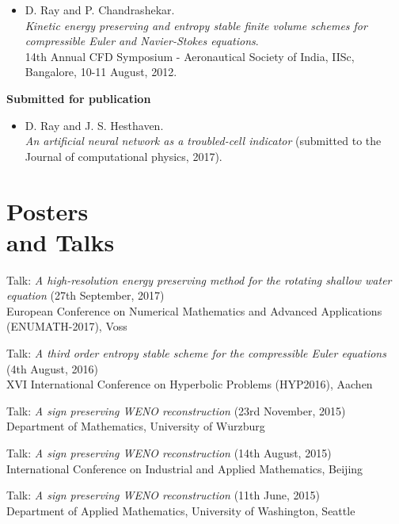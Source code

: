 \documentclass[margin]{res}
\begin{document}
\begin{resume}
\begin{itemize}
              \item D. Ray and P. Chandrashekar.\\
              {\it Kinetic energy preserving and entropy stable finite volume schemes for compressible Euler and Navier-Stokes equations}.\\
              14th Annual CFD Symposium - Aeronautical Society of India, IISc, Bangalore, 10-11 August, 2012.
             \end{itemize}

\textbf{Submitted for publication}                
            \begin{itemize}           
              
              \item D. Ray and J. S. Hesthaven.\\
              {\it An artificial neural network as a troubled-cell indicator} (submitted to the Journal of computational physics, 2017).
             \end{itemize}

             
\section{Posters \\ and Talks}
              
              Talk: {\it A high-resolution energy preserving method for the rotating shallow water equation} (27th September, 2017)\\
               European Conference on Numerical Mathematics and Advanced Applications (ENUMATH-2017), Voss
              
              Talk: {\it A third order entropy stable scheme for the compressible Euler equations} (4th August, 2016)\\
               XVI International Conference on Hyperbolic Problems (HYP2016), Aachen 
              
              Talk: {\it A sign preserving WENO reconstruction} (23rd November, 2015)\\
               Department of Mathematics, University of W$\ddot{\text{u}}$rzburg 
              
              Talk: {\it A sign preserving WENO reconstruction} (14th August, 2015)\\
              International Conference on Industrial and Applied Mathematics, Beijing
              
              Talk: {\it A sign preserving WENO reconstruction} (11th June, 2015)\\
              Department of Applied Mathematics, University of Washington, Seattle
              

\end{resume}
\end{document}
